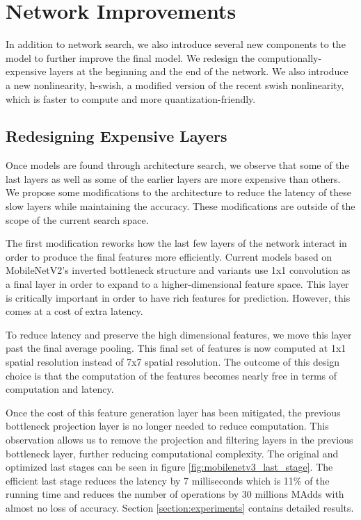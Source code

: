 \documentclass[10pt,twocolumn,letterpaper]{article}
\begin{document}
\section{Network Improvements}
\label{section:improvements}
In addition to network search, we also introduce several new components to the model to further improve the final model. We redesign the computionally-expensive layers at the beginning and the end of the network. We also introduce a new nonlinearity, h-swish, a modified version of the recent swish nonlinearity, which is faster to compute and more quantization-friendly.

\subsection{Redesigning Expensive Layers}

Once models are found through architecture search, we observe that some of the last layers as well as some of the earlier layers are more expensive than others. We propose some modifications to the architecture to reduce the latency of these slow layers while maintaining the accuracy. These modifications are outside of the scope of the current search space. 

The first modification reworks how the last few layers of the network interact in order to produce the final features more efficiently. Current models based on MobileNetV2's inverted bottleneck structure and variants use 1x1 convolution as a final layer in order to expand to a higher-dimensional feature space. This layer is critically important in order to have rich  features for prediction. However, this comes at a cost of extra latency. 

To reduce latency and preserve the high dimensional features, we move this layer past the final average pooling. This final set of features is now computed at 1x1 spatial resolution instead of 7x7 spatial resolution. The outcome of this design choice is that the computation of the features becomes nearly free in terms of computation and latency.

Once the cost of this feature generation layer has been mitigated, the previous bottleneck projection layer is no longer needed to reduce computation. This observation allows us to remove the projection and filtering layers in the previous bottleneck layer, further reducing computational complexity. The original and optimized last stages can be seen in figure \ref{fig:mobilenetv3_last_stage}. The efficient last stage reduces the latency by 7 milliseconds which is 11\% of the running time and reduces the number of operations by 30 millions MAdds with almost no loss of accuracy. Section \ref{section:experiments} contains detailed results. 
\end{document}
